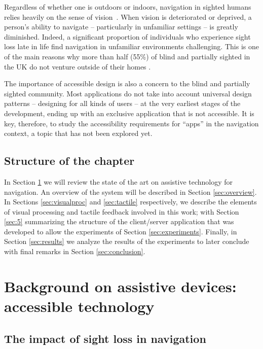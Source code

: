 Regardless of whether one is outdoors or indoors, navigation in sighted humans relies heavily on the sense of vision~\citep{kalia2008learning,tsuji2005landmarks}. When vision is deteriorated or deprived, a person's ability to navigate -- particularly in unfamiliar settings -- is greatly diminished. Indeed, a significant proportion of individuals who experience sight loss late in life find navigation in unfamiliar environments challenging. This is one of the main reasons why more than half (55\%) of blind and partially sighted in the UK do not venture outside of their homes \citep{Worsfold2010}.

The importance of accessible design is also a concern to the blind and partially sighted community. Most applications do not take into account universal design patterns -- designing for all kinds of users -- at the very earliest stages of the development, ending up with an exclusive application that is not accessible\citep{AndroidHackathon}. It is key, therefore, to study the accessibility requirements for ``apps'' in the navigation context, a topic that has not been explored yet.


\subsection{Structure of the chapter}

In Section \ref{sec:2} we will review the state of the art on assistive technology for navigation. An overview of the system will be described in Section \ref{sec:overview}. In Sections \ref{sec:visualproc} and \ref{sec:tactile} respectively, we describe the elements of visual processing and tactile feedback involved in this work; with Section \ref{sec:5} summarizing the structure of the client/server application that was developed to allow the experiments of Section \ref{sec:experiments}. Finally, in Section \ref{sec:results} we analyze the results of the experiments to later conclude with final remarks in Section \ref{sec:conclusion}.

\section{Background on assistive devices: accessible technology}
\label{sec:2}

\subsection{The impact of sight loss in navigation}

